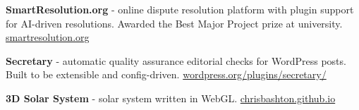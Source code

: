\documentclass[10pt,a4paper,ragged2e,withhyper]{altacv}
\begin{document}
\begin{paracol}{2}
\medskip


\vspace{\spacer}

\textbf{SmartResolution.org} - online dispute resolution platform with plugin support for AI-driven resolutions. Awarded the Best Major Project prize at university.
\newline
\href{https://smartresolution.org}{\url{smartresolution.org}}

\medskip


\medskip

\textbf{Secretary} - automatic quality assurance editorial checks for WordPress posts. Built to be extensible and config-driven.
\newline
\href{https://wordpress.org/plugins/secretary/}{\url{wordpress.org/plugins/secretary/}}

\medskip


\medskip

\textbf{3D Solar System} - solar system written in WebGL.
\newline
\href{https://chrisbashton.github.io}{\url{chrisbashton.github.io}}

\medskip


\medskip



\customreferences

\end{paracol}
\end{document}
